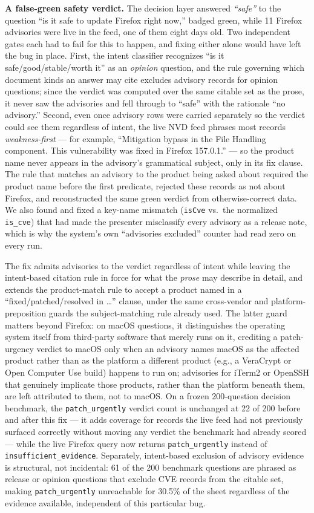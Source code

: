 \documentclass[acmsmall,review,anonymous,screen]{acmart}
\begin{document}
\textbf{A false-green safety verdict.} The decision layer answered
\emph{``safe''} to the question ``is it safe to update Firefox right now,''
badged green, while 11 Firefox advisories were live in the feed, one of them
eight days old. Two independent gates each had to fail for this to happen,
and fixing either alone would have left the bug in place. First, the intent
classifier recognizes ``is it safe/good/stable/worth it'' as an
\emph{opinion} question, and the rule governing which document kinds an
answer may cite excludes advisory records for opinion questions; since the
verdict was computed over the same citable set as the prose, it never saw the
advisories and fell through to ``safe'' with the rationale ``no advisory.''
Second, even once advisory rows were carried separately so the verdict could
see them regardless of intent, the live NVD feed phrases most records
\emph{weakness-first} --- for example, ``Mitigation bypass in the File
Handling component. This vulnerability was fixed in Firefox 157.0.1.'' --- so
the product name never appears in the advisory's grammatical subject, only in
its fix clause. The rule that matches an advisory to the product being asked
about required the product name before the first predicate, rejected these
records as not about Firefox, and reconstructed the same green verdict from
otherwise-correct data. We also found and fixed a key-name mismatch
(\texttt{isCve} vs.\ the normalized \texttt{is\_cve}) that had made the
presenter misclassify every advisory as a release note, which is why the
system's own ``advisories excluded'' counter had read zero on every run.

The fix admits advisories to the verdict regardless of intent while leaving
the intent-based citation rule in force for what the \emph{prose} may
describe in detail, and extends the product-match rule to accept a product
named in a ``fixed/patched/resolved in \ldots'' clause, under the same
cross-vendor and platform-preposition guards the subject-matching rule
already used. The latter guard matters beyond Firefox: on macOS questions, it
distinguishes the operating system itself from third-party software that
merely runs on it, crediting a patch-urgency verdict to macOS only when an
advisory names macOS as the affected product rather than as the platform a
different product (e.g., a VeraCrypt or Open Computer Use build) happens to
run on; advisories for iTerm2 or OpenSSH that genuinely implicate those
products, rather than the platform beneath them, are left attributed to
them, not to macOS. On a frozen 200-question decision benchmark, the
\texttt{patch\_urgently} verdict count is unchanged at 22 of 200 before and
after this fix --- it adds coverage for records the live feed had not
previously surfaced correctly without moving any verdict the benchmark had
already scored --- while the live Firefox query now returns
\texttt{patch\_urgently} instead of \texttt{insufficient\_evidence}. Separately,
intent-based exclusion of advisory evidence is structural, not incidental: 61
of the 200 benchmark questions are phrased as release or opinion questions
that exclude CVE records from the citable set, making \texttt{patch\_urgently}
unreachable for 30.5\% of the sheet regardless of the evidence available,
independent of this particular bug.
\end{document}
